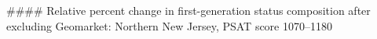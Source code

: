 #### Relative percent change in first-generation status composition after excluding Geomarket: Northern New Jersey, PSAT score 1070–1180
